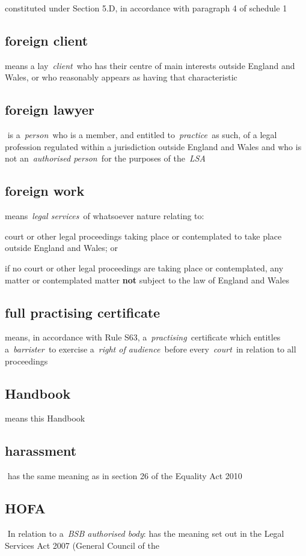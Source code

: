   constituted under Section 5.D, in accordance with paragraph 4 of
  schedule 1  \subsection{foreign client } means a lay~\emph{client~}who has their
  centre of main interests outside England and Wales, or who reasonably
  appears as having that characteristic  \subsection{foreign lawyer } is a~\emph{person~}who is a member, and
  entitled to~\emph{practice~}as such, of a legal profession regulated
  within a jurisdiction outside England and Wales and who is not
  an~\emph{authorised person~}for the purposes of the~\emph{LSA} \subsection{foreign work } means~\emph{legal services~}of whatsoever
  nature relating to: \al \item court or other legal proceedings taking place
  or contemplated to take place outside England and Wales; or \item if no
  court or other legal proceedings are taking place or contemplated, any
  matter or contemplated matter \textbf{not} subject to the law of England and
  Wales\la  \subsection{full practising certificate } means, in accordance with Rule
  S63, a~\emph{practising~}certificate which entitles
  a~\emph{barrister~}to exercise a~\emph{right of audience~}before
  every~\emph{court~}in relation to all proceedings
    \subsection{Handbook } means this Handbook  \subsection{harassment } has the same meaning as in section 26 of the
  Equality Act 2010  \subsection{HOFA } In relation to a~\emph{BSB authorised body}: has the
  meaning set out in the Legal Services Act 2007 (General Council of the
